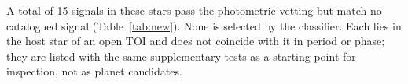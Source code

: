 A total of 15 signals in these stars pass the photometric vetting but match no catalogued signal
(Table~\ref{tab:new}). None is selected by the classifier. Each lies in the host star of an open
TOI and does not coincide with it in period or phase; they are listed with the same supplementary
tests as a starting point for inspection, not as planet candidates.
